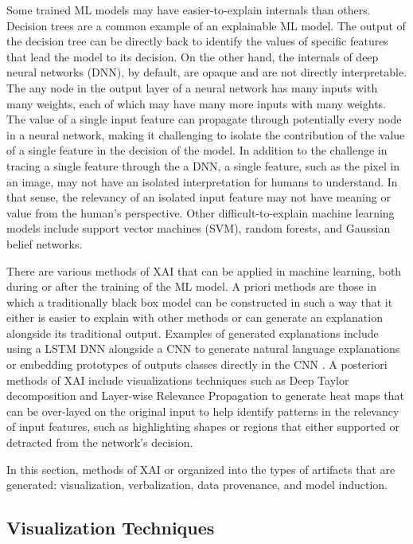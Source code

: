 \documentclass{IEEEtran}
\begin{document}
Some trained ML models may have easier-to-explain internals than others.  Decision trees are a common example of an explainable ML model.  The output of the decision tree can be directly back to identify the values of specific features that lead the model to its decision.  On the other hand, the internals of deep neural networks (DNN), by default, are opaque and are not directly interpretable.  The any node in the output layer of a neural network has many inputs with many weights, each of which may have many more inputs with many weights.  The value of a single input feature can propagate through potentially every node in a neural network, making it challenging to isolate the contribution of the value of a single feature in the decision of the model.  In addition to the challenge in tracing a single feature through the a DNN, a single feature, such as the pixel in an image, may not have an isolated interpretation for humans to understand.  In that sense, the relevancy of an isolated input feature may not have meaning or value from the human's perspective.  Other difficult-to-explain machine learning models include support vector machines (SVM), random forests, and Gaussian belief networks.

There are various methods of XAI that can be applied in machine learning, both during or after the training of the ML model.  A priori methods are those in which a traditionally black box model can be constructed in such a way that it either is easier to explain with other methods or can generate an explanation alongside its traditional output.  Examples of generated explanations include using a LSTM DNN alongside a CNN to generate natural language explanations \cite{10.1007/978-3-319-46493-0_1} or embedding prototypes of outputs classes directly in the CNN \cite{Chen2018}.  A posteriori methods of XAI include visualizations techniques such as Deep Taylor decomposition and Layer-wise Relevance Propagation to generate heat maps that can be over-layed on the original input to help identify patterns in the relevancy of input features, such as highlighting shapes or regions that either supported or detracted from the network's decision.

In this section, methods of XAI or organized into the types of artifacts that are generated: visualization, verbalization, data provenance, and model induction.

\subsection{Visualization Techniques}
\end{document}
